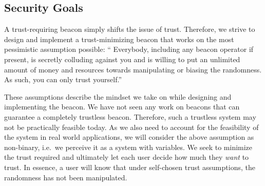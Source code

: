 \subsection{Security Goals}\label{sec:security_goals}
A trust-requiring beacon simply shifts the issue of trust.
Therefore, we strive to design and implement a trust-minimizing beacon that works on the most pessimistic assumption possible:
\enquote{%
Everybody, including any beacon operator if present, is secretly colluding against you and is willing to put an unlimited amount of money and resources towards manipulating or biasing the randomness.
As such, you can only trust yourself.}

These assumptions describe the mindset we take on while designing and implementing the beacon.
We have not seen any work on beacons that can guarantee a completely trustless beacon. Therefore, such a trustless system may not be practically feasible today.
As we also need to account for the feasibility of the system in real world applications, we will consider the above assumption as non-binary, i.e.\ we perceive it as a system with variables. 
We seek to minimize the trust required and ultimately let each user decide how much they \emph{want} to trust.
In essence, a user will know that under self-chosen trust assumptions, the randomness has not been manipulated.
